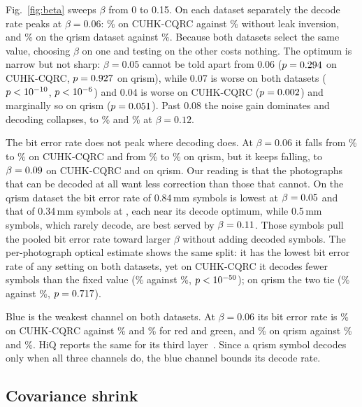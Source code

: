 Fig.~\ref{fig:beta} sweeps $\beta$ from 0 to 0.15. On each dataset separately the decode
rate peaks at $\beta=0.06$: \HiqCodeChosen\% on CUHK-CQRC against \HiqCodeNoDeblur\%
without leak inversion, and \QrCodeChosen\% on the qrism dataset against
\QrCodeNoDeblur\%. Because both datasets select the same value, choosing $\beta$ on one
and testing on the other costs nothing. The optimum is narrow but not sharp: $\beta=0.05$
cannot be told apart from 0.06 ($p=0.294$ on CUHK-CQRC, $p=0.927$ on qrism), while 0.07 is
worse on both datasets ($p<10^{-10}$, $p<10^{-6}$) and 0.04 is worse on CUHK-CQRC
($p=0.002$) and marginally so on qrism ($p=0.051$). Past 0.08
the noise gain dominates and decoding collapses, to \HiqCodeTwelve\% and \QrCodeTwelve\%
at $\beta=0.12$.

The bit error rate does not peak where decoding does. At $\beta=0.06$ it falls from
\HiqBerNoDeblur\% to \HiqBerChosen\% on CUHK-CQRC and from \QrBerNoDeblur\% to
\QrBerChosen\% on qrism, but it keeps falling, to $\beta=0.09$ on CUHK-CQRC and
\QrBerMinBeta{} on qrism. Our reading is that the photographs that can be decoded at all
want less correction than those that cannot. On
the qrism dataset the bit error rate of 0.84\,mm symbols is lowest at
$\beta=0.05$ and that of 0.34\,mm symbols at \QrBerMinBetaPxEight, each near
its decode optimum, while
0.5\,mm symbols, which rarely decode, are best served by $\beta=0.11$.
Those symbols pull the pooled bit error rate toward larger $\beta$
without adding decoded symbols. The per-photograph optical estimate shows the same split:
it has the lowest bit error rate of any setting on both datasets, yet on CUHK-CQRC it
decodes fewer symbols than the fixed value (\HiqCodeOptical\% against \HiqCodeChosen\%,
$p<10^{-50}$); on qrism the two tie (\QrCodeOptical\% against \QrCodeChosen\%,
$p=0.717$).

Blue is the weakest channel on both datasets. At $\beta=0.06$ its bit error rate is
\HiqBerChosenB\% on CUHK-CQRC against \HiqBerChosenR\% and \HiqBerChosenG\% for red and
green, and \QrBerChosenB\% on qrism against \QrBerChosenR\% and \QrBerChosenG\%. HiQ
reports the same for its third layer~\cite{yang2018hiq}. Since a qrism symbol decodes only
when all three channels do, the blue channel bounds its decode rate.

\subsection{Covariance shrink}

